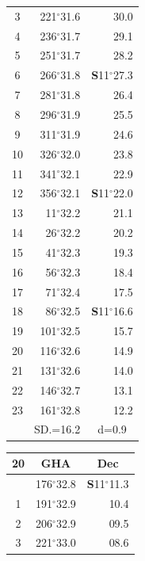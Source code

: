 \documentclass[10pt, a4paper]{report}
\begin{document}
\begin{scriptsize}
\begin{tabular*}{0.2\textwidth}[t]{@{\extracolsep{\fill}}|c|rr|}
3 & 221$^\circ$31.6 & \raisebox{0.24ex}{\boldmath$\cdot$~\boldmath$\cdot$~~}30.0\\
4 & 236$^\circ$31.7 & 29.1\\
5 & 251$^\circ$31.7 & 28.2\\[2Pt]
6 & 266$^\circ$31.8 & \textbf{S}11$^\circ$27.3\\
7 & 281$^\circ$31.8 & 26.4\\
8 & 296$^\circ$31.9 & 25.5\\
9 & 311$^\circ$31.9 & \raisebox{0.24ex}{\boldmath$\cdot$~\boldmath$\cdot$~~}24.6\\
10 & 326$^\circ$32.0 & 23.8\\
11 & 341$^\circ$32.1 & 22.9\\[2Pt]
12 & 356$^\circ$32.1 & \textbf{S}11$^\circ$22.0\\
13 & 11$^\circ$32.2 & 21.1\\
14 & 26$^\circ$32.2 & 20.2\\
15 & 41$^\circ$32.3 & \raisebox{0.24ex}{\boldmath$\cdot$~\boldmath$\cdot$~~}19.3\\
16 & 56$^\circ$32.3 & 18.4\\
17 & 71$^\circ$32.4 & 17.5\\[2Pt]
18 & 86$^\circ$32.5 & \textbf{S}11$^\circ$16.6\\
19 & 101$^\circ$32.5 & 15.7\\
20 & 116$^\circ$32.6 & 14.9\\
21 & 131$^\circ$32.6 & \raisebox{0.24ex}{\boldmath$\cdot$~\boldmath$\cdot$~~}14.0\\
22 & 146$^\circ$32.7 & 13.1\\
23 & 161$^\circ$32.8 & 12.2\\
\hline
\rule{0pt}{2.4ex} & \multicolumn{1}{c}{SD.=16.2} & \multicolumn{1}{c|}{d=0.9}\\
\hline
\end{tabular*}\noindent
\begin{tabular*}{0.2\textwidth}[t]{@{\extracolsep{\fill}}|c|rr|}
\hline
\multicolumn{1}{|c|}{\rule{0pt}{2.6ex}\textbf{20}} & \multicolumn{1}{c}{\textbf{GHA}} & \multicolumn{1}{c|}{\textbf{Dec}}\\
\hline\rule{0pt}{2.6ex}\noindent
0 & 176$^\circ$32.8 & \textbf{S}11$^\circ$11.3\\
1 & 191$^\circ$32.9 & 10.4\\
2 & 206$^\circ$32.9 & 09.5\\
3 & 221$^\circ$33.0 & \raisebox{0.24ex}{\boldmath$\cdot$~\boldmath$\cdot$~~}08.6\\

\end{tabular*}
\end{scriptsize}
\end{document}
